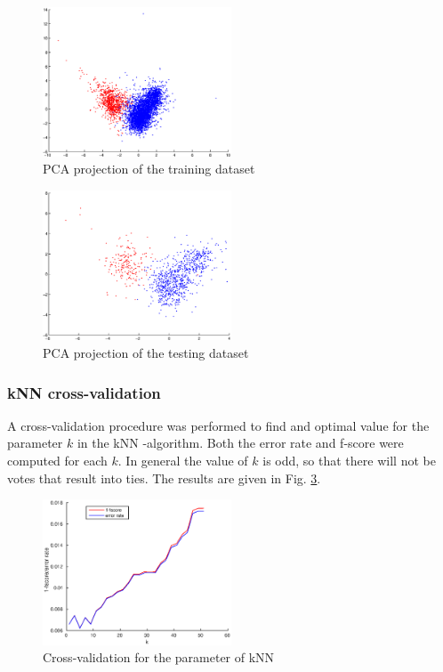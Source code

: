 \documentclass[twoside]{article}
\begin{document}
\begin{multicols}{2}
\begin{figure}[H]
\centering
\includegraphics[width=0.5\textwidth]{trainingpca}
\caption{PCA projection of the training dataset}
\label{fig:color_training_pca}
\end{figure}

\begin{figure}[H]
\centering
\includegraphics[width=0.5\textwidth]{testpca}
\caption{PCA projection of the testing dataset}
\label{fig:color_testing_pca}
\end{figure}

\subsubsection{kNN cross-validation}

A cross-validation procedure was performed to find and optimal value for the parameter $k$ in the 
kNN -algorithm. Both the error rate and f-score were computed for each $k$. In general the value
of $k$ is odd, so that there will not be votes that result into ties. The results are given in
Fig. \ref{fig:knncrossval}.

\begin{figure}[H]
\centering
\includegraphics[width=0.5\textwidth]{knncrossval}
\caption{Cross-validation for the parameter of kNN}
\label{fig:knncrossval}
\end{figure}


\end{multicols}
\end{document}

